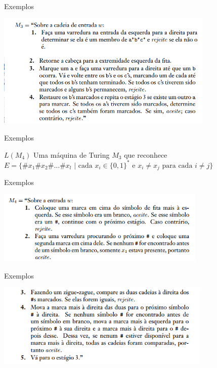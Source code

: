 \documentclass[xcolor=dvipsnames,table]{beamer}
\begin{document}
	\begin{frame}{Exemplos}
	\begin{center}
			\includegraphics[height=5.5cm]{images/m3.png}
		\end{center}
	\end{frame}
	
	\begin{frame}{Exemplos}
		\begin{block}{$L(M_4)$}
		Uma máquina de Turing $M_3$ que reconhece $E = \{ \# x_1 \# x_2 \# \ldots \# x_l \mbox{ | cada } x_i \in \{ 0,1 \}^* \mbox{ e } x_i \not= x_j \mbox{ para cada } i \not= j \}$		
		\end{block}
	\end{frame}
	
	\begin{frame}{Exemplos}
	\begin{center}
			\includegraphics[height=3.5cm]{images/m4-1.png}
		\end{center}
	\end{frame}
	
	\begin{frame}{Exemplos}
	\begin{center}
			\includegraphics[height=4cm]{images/m4-2.png}
		\end{center}
	\end{frame}
    
\end{document}
